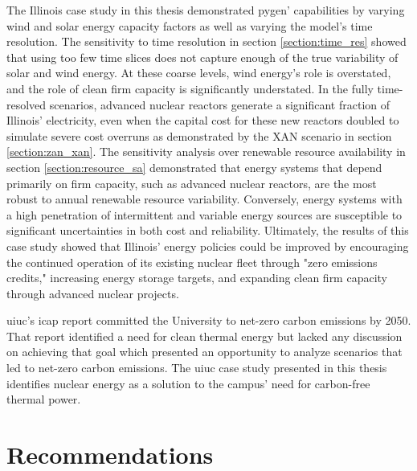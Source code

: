 The Illinois case study in this thesis
demonstrated \gls{pygen}' capabilities by varying wind and solar energy capacity factors
as well as varying the model's time resolution. The sensitivity to time resolution
in section \ref{section:time_res}
showed that using too few time slices does not capture enough of the true variability
of solar and wind energy. At these coarse levels, wind energy's role is overstated,
and the role of clean firm capacity is significantly understated. In the fully
time-resolved scenarios, advanced nuclear reactors generate a significant fraction
of Illinois' electricity, even when the capital cost for these new reactors doubled
to simulate severe cost overruns as demonstrated by the \gls{XAN} scenario in section
\ref{section:zan_xan}. The sensitivity analysis over renewable resource
availability in section \ref{section:resource_sa} demonstrated that energy systems
that depend primarily on firm
capacity, such as advanced nuclear reactors, are the most robust to annual renewable
resource variability. Conversely, energy systems with a high penetration of intermittent
and variable energy sources are susceptible to significant uncertainties in both cost
and reliability. Ultimately, the results of this case study showed that Illinois'
energy policies could be improved by encouraging the continued operation of its
existing nuclear fleet through "zero emissions credits," increasing energy storage
targets, and expanding clean firm capacity through advanced nuclear projects.

\gls{uiuc}'s \gls{icap} report committed the University to net-zero carbon emissions
by 2050. That report identified a need for clean thermal energy but lacked any
discussion on achieving that goal which presented an opportunity to analyze scenarios
that led to net-zero carbon emissions. The \gls{uiuc} case study presented
in this thesis identifies nuclear energy as a solution to the campus' need for
carbon-free thermal power.

\section{Recommendations}

